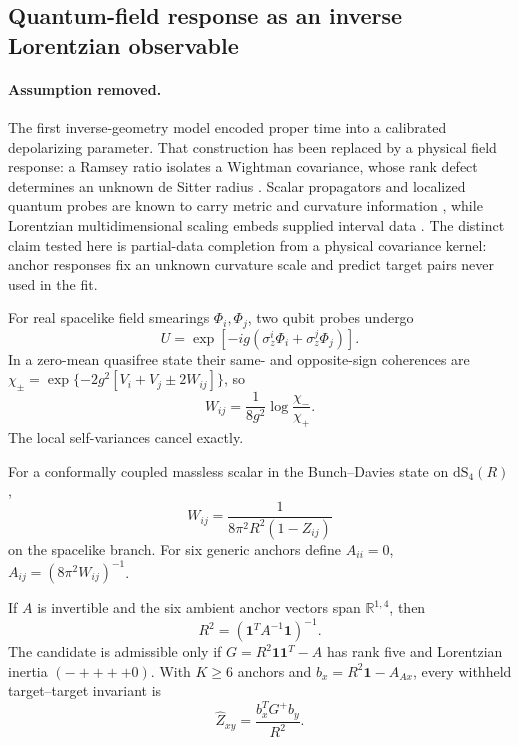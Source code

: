 \subsection{Quantum-field response as an inverse Lorentzian observable}
\label{sec:loop-lorentz}

\paragraph{Assumption removed.}
The first inverse-geometry model encoded proper time into a calibrated
depolarizing parameter.  That construction has been replaced by a physical
field response: a Ramsey ratio isolates a Wightman covariance, whose
rank defect determines an unknown de Sitter radius
\cite{XuLorentz2026}.  Scalar propagators and localized quantum probes are
known to carry metric and curvature information
\cite{SaravaniAslanbeigiKempf2016,PercheMartinMartinez2022}, while
Lorentzian multidimensional scaling embeds supplied interval data
\cite{CloughEvans2017}.  The distinct claim tested here is partial-data
completion from a physical covariance kernel: anchor responses fix an
unknown curvature scale and predict target pairs never used in the fit.

For real spacelike field smearings \(\Phi_i,\Phi_j\), two qubit probes undergo
\begin{equation}
 U=\exp[-ig(\sigma_z^i\Phi_i+\sigma_z^j\Phi_j)] .
 \label{eq:loop-ramsey-unitary}
\end{equation}
In a zero-mean quasifree state their same- and opposite-sign coherences are
\(\chi_\pm=\exp\{-2g^2[V_i+V_j\pm2W_{ij}]\}\), so
\begin{equation}
 W_{ij}=\frac{1}{8g^2}\log\frac{\chi_-}{\chi_+}.
 \label{eq:loop-ramsey-ratio}
\end{equation}
The local self-variances cancel exactly.

For a conformally coupled massless scalar in the Bunch--Davies state on
\(\mathrm{dS}_4(R)\),
\begin{equation}
 W_{ij}=\frac{1}{8\pi^2R^2(1-Z_{ij})}
 \label{eq:loop-ds-kernel}
\end{equation}
on the spacelike branch.  For six generic anchors define
\(A_{ii}=0\), \(A_{ij}=(8\pi^2W_{ij})^{-1}\).

\begin{theorem}
\label{thm:loop-lorentz}
If \(A\) is invertible and the six ambient anchor vectors span
\(\mathbb R^{1,4}\), then
\begin{equation}
 R^2=(\mathbf1^TA^{-1}\mathbf1)^{-1}.
 \label{eq:loop-radius}
\end{equation}
The candidate is admissible only if
\(G=R^2\mathbf1\mathbf1^T-A\) has rank five and Lorentzian inertia
\((-++++0)\).  With \(K\ge6\) anchors and
\(b_x=R^2\mathbf1-A_{Ax}\), every withheld target--target invariant is
\begin{equation}
 \widehat Z_{xy}=\frac{b_x^TG^+b_y}{R^2}.
 \label{eq:loop-blind-completion}
\end{equation}
\end{theorem}


